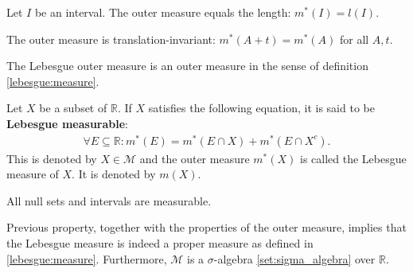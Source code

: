 
    \begin{property}
        Let $I$ be an interval. The outer measure equals the length: $m^*(I) = l(I)$.
    \end{property}
    \begin{property}
        The outer measure is translation-invariant: $m^*(A + t) = m^*(A)$ for all $A,t$.
    \end{property}
    \begin{property}
        The Lebesgue outer measure is an outer measure in the sense of definition \ref{lebesgue:measure}.
    \end{property}

    \begin{theorem}\label{lebesgue:lebesgue_measure}
        Let $X$ be a subset of $\mathbb{R}$. If $X$ satisfies the following equation, it is said to be \textbf{Lebesgue measurable}:
        \begin{gather}
            \forall E\subseteq\mathbb{R}:m^*(E) = m^*(E\cap X) + m^*(E\cap X^c).
        \end{gather}
        This is denoted by $X\in\mathcal{M}$ and the outer measure $m^*(X)$ is called the Lebesgue measure of $X$. It is denoted by $m(X)$.
    \end{theorem}
    \begin{property}
        All null sets and intervals are measurable.
    \end{property}
    \begin{remark}
       Previous property, together with the properties of the outer measure, implies that the Lebesgue measure is indeed a proper measure as defined in \ref{lebesgue:measure}. Furthermore, $\mathcal{M}$ is a $\sigma$-algebra \ref{set:sigma_algebra} over $\mathbb{R}$.
    \end{remark}

